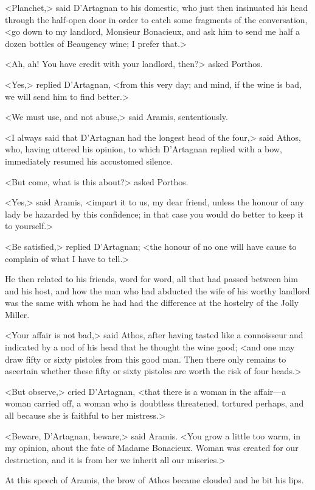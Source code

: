 <Planchet,> said D'Artagnan to his domestic, who just then insinuated his head through the half-open door in order to catch some fragments of the conversation, <go down to my landlord, Monsieur Bonacieux, and ask him to send me half a dozen bottles of Beaugency wine; I prefer that.> 

<Ah, ah! You have credit with your landlord, then?> asked Porthos. 

<Yes,> replied D'Artagnan, <from this very day; and mind, if the wine is bad, we will send him to find better.> 

<We must use, and not abuse,> said Aramis, sententiously. 

<I always said that D'Artagnan had the longest head of the four,> said Athos, who, having uttered his opinion, to which D'Artagnan replied with a bow, immediately resumed his accustomed silence. 

<But come, what is this about?> asked Porthos. 

<Yes,> said Aramis, <impart it to us, my dear friend, unless the honour of any lady be hazarded by this confidence; in that case you would do better to keep it to yourself.> 

<Be satisfied,> replied D'Artagnan; <the honour of no one will have cause to complain of what I have to tell.> 

He then related to his friends, word for word, all that had passed between him and his host, and how the man who had abducted the wife of his worthy landlord was the same with whom he had had the difference at the hostelry of the Jolly Miller. 

<Your affair is not bad,> said Athos, after having tasted like a connoisseur and indicated by a nod of his head that he thought the wine good; <and one may draw fifty or sixty pistoles from this good man. Then there only remains to ascertain whether these fifty or sixty pistoles are worth the risk of four heads.> 

<But observe,> cried D'Artagnan, <that there is a woman in the affair—a woman carried off, a woman who is doubtless threatened, tortured perhaps, and all because she is faithful to her mistress.> 

<Beware, D'Artagnan, beware,> said Aramis. <You grow a little too warm, in my opinion, about the fate of Madame Bonacieux. Woman was created for our destruction, and it is from her we inherit all our miseries.> 

At this speech of Aramis, the brow of Athos became clouded and he bit his lips. 

